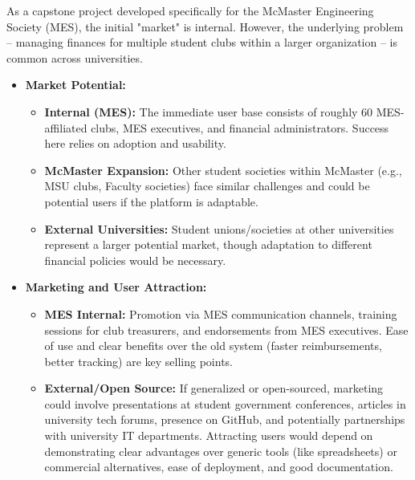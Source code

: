 \documentclass{article}
\begin{document}

As a capstone project developed specifically for the McMaster Engineering Society (MES), the initial "market" is internal. However, the underlying problem – managing finances for multiple student clubs within a larger organization – is common across universities.

\begin{itemize}
    \item \textbf{Market Potential:}
        \begin{itemize}
            \item \textbf{Internal (MES):} The immediate user base consists of roughly 60 MES-affiliated clubs, MES executives, and financial administrators. Success here relies on adoption and usability.
            \item \textbf{McMaster Expansion:} Other student societies within McMaster (e.g., MSU clubs, Faculty societies) face similar challenges and could be potential users if the platform is adaptable.
            \item \textbf{External Universities:} Student unions/societies at other universities represent a larger potential market, though adaptation to different financial policies would be necessary.
        \end{itemize}

    \item \textbf{Marketing and User Attraction:}
        \begin{itemize}
            \item \textbf{MES Internal:} Promotion via MES communication channels, training sessions for club treasurers, and endorsements from MES executives. Ease of use and clear benefits over the old system (faster reimbursements, better tracking) are key selling points.
            \item \textbf{External/Open Source:} If generalized or open-sourced, marketing could involve presentations at student government conferences, articles in university tech forums, presence on GitHub, and potentially partnerships with university IT departments. Attracting users would depend on demonstrating clear advantages over generic tools (like spreadsheets) or commercial alternatives, ease of deployment, and good documentation.
        \end{itemize}


\end{itemize}
\end{document}
